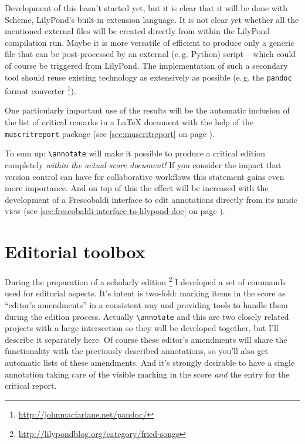 \documentclass[oneside]{OLLbook}
\begin{document}
Development of this hasn't started yet, but it is clear that it will be done with Scheme, LilyPond's built-in extension language.
It is not clear yet whether all the mentioned external files will be created directly from within the LilyPond compilation run.
Maybe it is more versatile of efficient to produce only a generic file that can be post-processed by an external (e.\,g. Python) script -- which could of course be triggered from LilyPond.
The implementation of such a secondary tool should reuse existing technology as extensively as possible (e.\,g. the \texttt{pandoc} format converter%
\footnote{\url{http://johnmacfarlane.net/pandoc/}}).

One particularly important use of the results will be the automatic inclusion of the list of critical remarks in a \LaTeX{} document with the help of the \texttt{muscritreport} package (see \ref{sec:muscritreport} on page \pageref{sec:muscritreport}).


\medskip
To sum up: \texttt{\textbackslash annotate} will make it possible to produce a critical edition completely \emph{within the actual score document!}
If you consider the impact that version control can have for collaborative workflows this statement gains even more importance.
And on top of this the effect will be increased with the development of a Frescobaldi interface to edit annotations directly from its music view (see \ref{sec:frescobaldi-interface-to-lilypond-doc} on page \pageref{sec:frescobaldi-interface-to-lilypond-doc}).


\section{Editorial toolbox}\label{sec:editorial-toolbox}
During the preparation of a scholarly edition%
\footnote{\url{http://lilypondblog.org/category/fried-songs}}
I developed a set of commands used for editorial aspects.
It's intent is two-fold: marking items in the score as “editor's amendments” in a consistent way and providing tools to handle them during the edition process.
Actually \texttt{\textbackslash annotate} and this are two closely related projects with a large intersection so they will be developed together, but I'll describe it separately here.
Of course these editor's amendments will share the functionality with the previously described annotations, so you'll also get automatic lists of these amendments.
And it's strongly desirable to have a single annotation taking care of the visible marking in the score \emph{and} the entry for the critical report.
\end{document}

